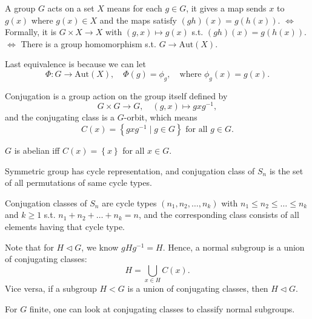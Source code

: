 \begin{prev}
    A group \(G\) acts on a set \(X\) means for each \(g \in G\), it gives a map sends \(x\) to \(g(x)\) where \(g(x) \in X\) and the maps satisfy \((gh)(x) = g(h(x))\). \(\iff \)  Formally, it is \(G \times X \to X\) with \((g, x) \mapsto g(x)\) s.t. \((gh)(x) = g(h(x))\). \(\iff \) There is a group homomorphism s.t. \(G \to \mathrm{Aut}(X) \).    
    \begin{remark}
        Last equivalence is because we can let 
        \[
            \Phi :G \to \mathrm{Aut}(X), \quad \Phi (g) = \phi _g, \quad \text{where } \phi _g(x) = g(x).  
        \]
    \end{remark}
    Conjugation is a group action on the group itself defined by 
    \[
        G \times G \to G, \quad (g, x) \mapsto g x g^{-1},
    \] and the conjugating class is a \(G\)-orbit, which means 
    \[
        C(x) = \left\{ g x g^{-1} \mid g \in G \right\} \text{ for all } g \in G. 
    \] 
    \begin{note}
        \(G\) is abelian iff \(C(x) = \left\{ x \right\} \) for all \(x 
        \in G\).   
    \end{note}

    Symmetric group has cycle representation, and conjugation class of \(S_n\) is the set of all permutations of same cycle types.  
\end{prev}

\begin{theorem}
    Conjugation classes of \(S_n\) are cycle types \((n_1, n_2, \dots , n_k)\) with \(n_1 \le n_2 \le \dots \le n_k\) and \(k \ge 1\) s.t. \(n_1 + n_2 + \dots + n_k = n\), and the corresponding class consists of all elements having that cycle type.     
\end{theorem}

Note that for \(H \triangleleft G\), we know \(g H g^{-1} = H\). Hence, a normal subgroup is a union of conjugating classes:
\[
    H = \bigcup_{x \in H} C(x). 
\]  Vice versa, if a subgroup \(H < G\) is a union of conjugating classes, then \(H \triangleleft G\). 

\begin{note}
    For \(G\) finite, one can look at conjugating classes to classify normal subgroups. 
\end{note}

